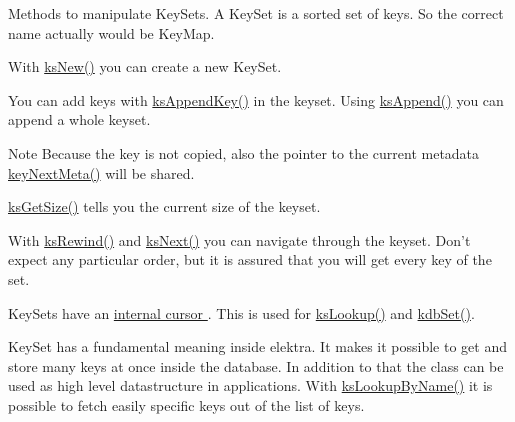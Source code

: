 Methods to manipulate Key\-Sets.  A Key\-Set is a sorted set of keys. So the correct name actually would be Key\-Map.

With \hyperlink{group__keyset_ga671e1aaee3ae9dc13b4834a4ddbd2c3c}{ks\-New()} you can create a new Key\-Set.

You can add keys with \hyperlink{group__keyset_gaa5a1d467a4d71041edce68ea7748ce45}{ks\-Append\-Key()} in the keyset. Using \hyperlink{group__keyset_ga21eb9c3a14a604ee3a8bdc779232e7b7}{ks\-Append()} you can append a whole keyset.

\begin{DoxyNote}{Note}
Because the key is not copied, also the pointer to the current metadata \hyperlink{group__keymeta_ga4c88342f580a4291455a801af71ce048}{key\-Next\-Meta()} will be shared. 
\end{DoxyNote}


\hyperlink{group__keyset_ga7474ad6b0a0fa969dbdf267ba5770eee}{ks\-Get\-Size()} tells you the current size of the keyset.

With \hyperlink{group__keyset_gabe793ff51f1728e3429c84a8a9086b70}{ks\-Rewind()} and \hyperlink{group__keyset_ga317321c9065b5a4b3e33fe1c399bcec9}{ks\-Next()} you can navigate through the keyset. Don't expect any particular order, but it is assured that you will get every key of the set.

Key\-Sets have an \hyperlink{group__keyset_ga4287b9416912c5f2ab9c195cb74fb094}{internal cursor }. This is used for \hyperlink{group__keyset_gaa34fc43a081e6b01e4120daa6c112004}{ks\-Lookup()} and \hyperlink{group__kdb_ga11436b058408f83d303ca5e996832bcf}{kdb\-Set()}.

Key\-Set has a fundamental meaning inside elektra. It makes it possible to get and store many keys at once inside the database. In addition to that the class can be used as high level datastructure in applications. With \hyperlink{group__keyset_gad2e30fb6d4739d917c5abb2ac2f9c1a1}{ks\-Lookup\-By\-Name()} it is possible to fetch easily specific keys out of the list of keys.

